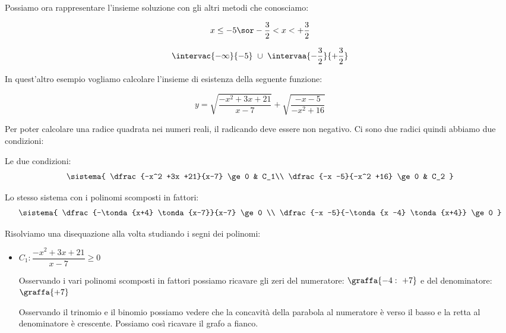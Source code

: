 \begin{esempio}
Possiamo ora rappresentare l'insieme soluzione con gli altri metodi che 
conosciamo:

\begin{minipage}{.49 \linewidth}
\[x \le -5 \sor -\dfrac{3}{2} < x < +\dfrac{3}{2}\]
\end{minipage}
\hfill
\begin{minipage}{.49 \linewidth}
\[\intervac{-\infty}{-5}~\cup~\intervaa{-\dfrac{3}{2}}{+\dfrac{3}{2}}\]
\end{minipage}
\end{esempio}

\newpage %

\begin{esempio}
 
In quest'altro esempio vogliamo calcolare l'insieme di esistenza della 
seguente funzione:

\[y = \sqrt{\dfrac{-x^2 +3x +21}{x-7}} + \sqrt{\dfrac{-x -5}{-x^2 +16}}
\]

Per poter calcolare una radice quadrata nei numeri reali, il radicando deve 
essere non negativo. Ci sono due radici quindi abbiamo due condizioni:

\begin{minipage}{.49 \linewidth}
Le due condizioni:
 \[\sistema{
    \dfrac{-x^2 +3x +21}{x-7} \ge 0 & C_1\\
    \dfrac{-x -5}{-x^2 +16} \ge 0 & C_2
  }
\]
\end{minipage}
\begin{minipage}{.49 \linewidth}
Lo stesso sistema con i polinomi scomposti in fattori:
\[\sistema{
    \dfrac{-\tonda{x+4} \tonda{x-7}}{x-7} \ge 0 \\
    \dfrac{-x -5}{-\tonda{x -4} \tonda{x+4}} \ge 0
  }
\]
\end{minipage}

Risolviamo una disequazione alla volta studiando i segni dei polinomi:

\begin{itemize}
 \item \(C_1: \dfrac{-x^2 +3x +21}{x-7} \ge 0\)

Osservando i vari polinomi scomposti in fattori possiamo ricavare gli zeri 
del numeratore: \(\graffa{-4:~+7}\) e del denominatore: \(\graffa{+7}\)

\begin{minipage}{.49\textwidth}
Osservando il trinomio e il binomio possiamo vedere che la concavità della 
parabola al numeratore è verso il basso e la retta al 
denominatore è crescente. Possiamo così ricavare il grafo a fianco.
\end{minipage}
\hfill
\begin{minipage}{.49\textwidth}
\begin{center} \segnosistemaba \end{center}
\end{minipage}


\end{itemize}
\end{esempio}

